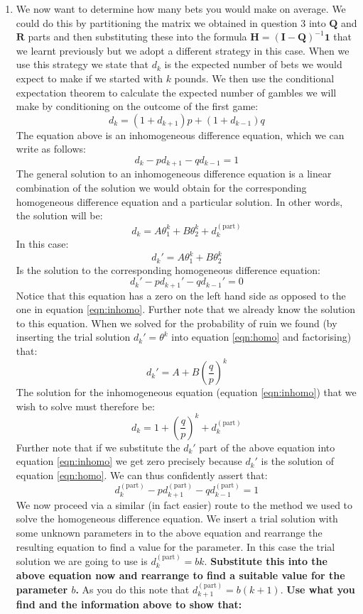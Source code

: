 \documentclass[a4paper]{article}
\begin{document}
\begin{enumerate}
 \item We now want to determine how many bets you would make on average.  We could do this by partitioning the matrix we obtained in question 3 into $\mathbf{Q}$ and $\mathbf{R}$
parts and then substituting these into the formula $\mathbf{H} = (\mathbf{I} - \mathbf{Q})^{-1} \mathbf{1}$ that we learnt previously but we adopt a different strategy in this case.   When
we use this strategy we state that $d_k$ is the expected number of bets we would expect to make if we started with $k$ pounds.  We then use the conditional expectation theorem to calculate the
expected number of gambles we will make by conditioning on the outcome of the first game:
\[
 d_k = (1+d_{k+1})p + (1 + d_{k-1})q
\]
The equation above is an inhomogeneous difference equation, which we can write as follows:
\begin{equation}
 d_k - pd_{k+1} - qd_{k-1} = 1
 \label{eqn:inhomo}
\end{equation}
The general solution to an inhomogeneous difference equation is a linear combination of the solution we would obtain for the corresponding homogeneous difference equation and a particular
solution.  In other words, the solution will be:
\[
d_k =  A \theta_1^k + B \theta_2^k + d^{(\textrm{part})}_k %
\]
In this case:
$$
d_k' = A \theta_1^k + B \theta_2^k
$$
Is the solution to the corresponding homogeneous difference equation:
\begin{equation}
d_k' - pd_{k+1}' - qd_{k-1}' = 0
\label{eqn:homo}
\end{equation}
Notice that this equation has a zero on the left hand side as opposed to the one in equation \ref{eqn:inhomo}.  Further note that we already know the solution to this equation.  When we solved for
the probability of ruin we found (by inserting the trial solution $d_k' = \theta^k$ into equation \ref{eqn:homo} and factorising) that:
$$
d_k' = A + B \left( \frac{q}{p} \right)^k
$$
The solution for the inhomogeneous equation (equation \ref{eqn:inhomo}) that we wish to solve must therefore be:
$$
d_k = 1 + \left( \frac{q}{p} \right)^k + d^{(\textrm{part})}_k
$$
Further note that if we substitute the $d_k'$ part of the above equation into equation \ref{eqn:inhomo} we get zero precisely because $d_k'$ is the solution of equation \ref{eqn:homo}.  We can thus
confidently assert that:
$$
d^{(\textrm{part})}_k - p d^{(\textrm{part})}_{k+1} - q d^{(\textrm{part})}_{k-1} = 1
$$
We now proceed via a similar (in fact easier) route to the method we used to solve the homogeneous difference equation.  We insert a trial solution with some unknown parameters in to the above
equation and rearrange the resulting equation to find a value for the parameter.  In this case the trial solution we are going to use is $d^{(\textrm{part})}_k = bk$.  {\bf Substitute this into the
above equation now and rearrange to find a suitable value for the parameter $b$.}  As you do this note that $d^{(\textrm{part})}_{k+1} = b(k+1)$.  {\bf Use what you find and the information above to
show that:}


\end{enumerate}
\end{document}
